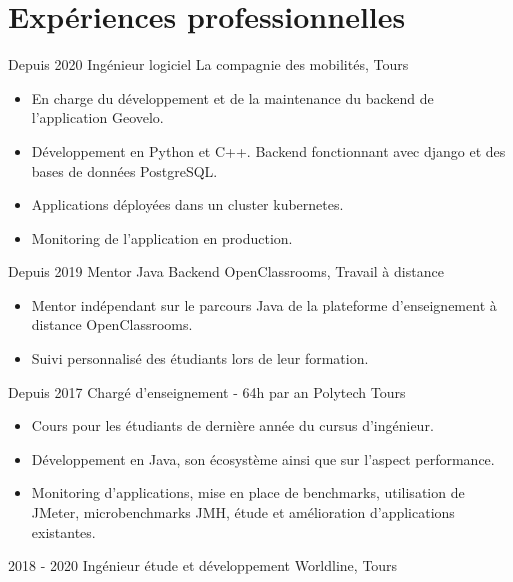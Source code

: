 \documentclass[]{friggeri-cv}
\begin{document}
\section{Expériences professionnelles}
\vspace{-5pt}
\begin{entrylist}
  \entry
  {Depuis 2020}
    {Ingénieur logiciel}
    {La compagnie des mobilités, Tours}
    {
    \vspace{-0.8\baselineskip}
	\begin{itemize}[leftmargin=*]
		\item En charge du développement et de la maintenance du backend de l'application Geovelo.
		\item Développement en Python et C++. Backend fonctionnant avec django et des bases de données PostgreSQL.
		\item Applications déployées dans un cluster kubernetes.
		\item Monitoring de l'application en production.
	\end{itemize}
	}
      \entry
    {Depuis 2019}
    {Mentor Java Backend}
    {OpenClassrooms, Travail à distance}
    {
    \vspace{-0.8\baselineskip}
	\begin{itemize}[leftmargin=*]
		\item Mentor indépendant sur le parcours Java de la plateforme d'enseignement à distance OpenClassrooms.
		\item  Suivi personnalisé des étudiants lors de leur formation. 
	\end{itemize}
	}
  \entry
    {Depuis 2017}
    {Chargé d'enseignement - 64h par an}
    {Polytech Tours}
    {
    \vspace{-0.8\baselineskip}
	\begin{itemize}[leftmargin=*]
		\item Cours pour les étudiants de dernière année du cursus d'ingénieur.
		\item Développement en Java, son écosystème ainsi que sur l'aspect performance.
		\item Monitoring d'applications, mise en place de benchmarks, utilisation de JMeter, microbenchmarks JMH, étude et amélioration d'applications existantes.
	\end{itemize}
	}
    \entry
    {2018 - 2020}
    {Ingénieur étude et développement}
    {Worldline, Tours}
    {
    \vspace{-0.8\baselineskip}
	\begin{itemize}[leftmargin=*]

\end{itemize}}
\end{entrylist}
\end{document}
